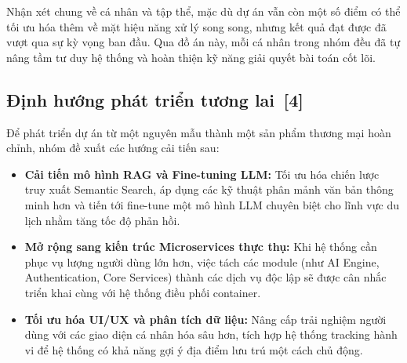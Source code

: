 \documentclass[12pt, a4paper]{article}
\begin{document}
Nhận xét chung về cá nhân và tập thể, mặc dù dự án vẫn còn một số điểm có thể tối ưu hóa thêm về mặt hiệu năng xử lý song song, nhưng kết quả đạt được đã vượt qua sự kỳ vọng ban đầu. Qua đồ án này, mỗi cá nhân trong nhóm đều đã tự nâng tầm tư duy hệ thống và hoàn thiện kỹ năng giải quyết bài toán cốt lõi.

\subsection[Định hướng phát triển tương lai]{Định hướng phát triển tương lai \,{\normalfont\small\textcolor{cyan!70!black}{[4]}}}
Để phát triển dự án từ một nguyên mẫu thành một sản phẩm thương mại hoàn chỉnh, nhóm đề xuất các hướng cải tiến sau:
\begin{itemize}
    \item \textbf{Cải tiến mô hình RAG và Fine-tuning LLM:} Tối ưu hóa chiến lược truy xuất Semantic Search, áp dụng các kỹ thuật phân mảnh văn bản thông minh hơn và tiến tới fine-tune một mô hình LLM chuyên biệt cho lĩnh vực du lịch nhằm tăng tốc độ phản hồi.
    \item \textbf{Mở rộng sang kiến trúc Microservices thực thụ:} Khi hệ thống cần phục vụ lượng người dùng lớn hơn, việc tách các module (như AI Engine, Authentication, Core Services) thành các dịch vụ độc lập sẽ được cân nhắc triển khai cùng với hệ thống điều phối container.
    \item \textbf{Tối ưu hóa UI/UX và phân tích dữ liệu:} Nâng cấp trải nghiệm người dùng với các giao diện cá nhân hóa sâu hơn, tích hợp hệ thống tracking hành vi để hệ thống có khả năng gợi ý địa điểm lưu trú một cách chủ động.
\end{itemize}
\end{document}

